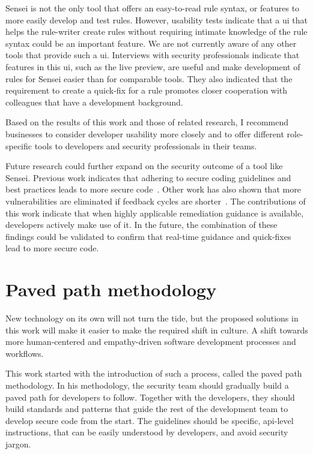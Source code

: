 Sensei is not the only tool that offers an easy-to-read rule syntax, or features to more easily develop and test rules.
However, usability tests indicate that a \gls{ui} that helps the rule-writer create rules without requiring intimate knowledge of the rule syntax could be an important feature.
We are not currently aware of any other tools that provide such a \gls{ui}.
Interviews with security professionals indicate that features in this \gls{ui}, such as the live preview, are useful and make development of rules for Sensei easier than for comparable tools.
They also indicated that the requirement to create a quick-fix for a rule promotes closer cooperation with colleagues that have a development background.

Based on the results of this work and those of related research, I recommend businesses to consider developer usability more closely and to offer different role-specific tools to developers and security professionals in their teams.

Future research could further expand on the security outcome of a tool like Sensei.
Previous work indicates that adhering to secure coding guidelines and best practices leads to more secure code~\cite{lipfordimpact,votipka2020understanding}.
Other work has also shown that more vulnerabilities are eliminated if feedback cycles are shorter~\cite{sampaio2016exploring}.
The contributions of this work indicate that when highly applicable remediation guidance is available, developers actively make use of it.
In the future, the combination of these findings could be validated to confirm that real-time guidance and quick-fixes lead to more secure code.

\section{Paved path methodology}
New technology on its own will not turn the tide, but the proposed solutions in this work will make it easier to make the required shift in culture.
A shift towards more human-centered and empathy-driven software development processes and workflows.

This work started with the introduction of such a process, called the paved path methodology.
In his methodology, the security team should gradually build a paved path for developers to follow.
Together with the developers, they should build standards and patterns that guide the rest of the development team to develop secure code from the start.
The guidelines should be specific, \gls{api}-level instructions, that can be easily understood by developers, and avoid security jargon.

